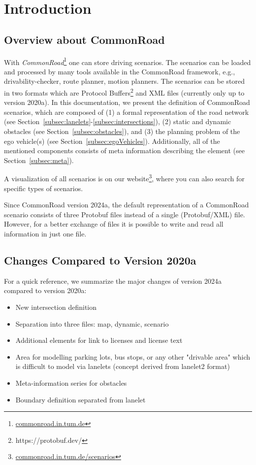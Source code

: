 
\section{Introduction}
\label{sec:introduction}
\subsection{Overview about CommonRoad}
With \textit{CommonRoad}\cite{Althoff2017a}\footnote{\href{https://commonroad.in.tum.de}{commonroad.in.tum.de}} one can store driving scenarios. The scenarios can be loaded and processed by many tools available in the CommonRoad framework, e.g., drivability-checker, route planner, motion planners.  
The scenarios can be stored in two formats which are Protocol Buffers\footnote{https://protobuf.dev/} and XML files (currently only up to version 2020a). 
In this documentation, we present the definition of CommonRoad scenarios, which are composed of (1) a formal representation of the road network (see Section~\ref{subsec:lanelets}-\ref{subsec:intersections}), (2) static and dynamic obstacles (see Section~\ref{subsec:obstacles}), and (3) the planning problem of the ego vehicle(s) (see Section~\ref{subsec:egoVehicles}). 
Additionally, all of the mentioned components consists of meta information describing the element (see Section~\ref{subsec:meta}).

A visualization of all scenarios is on our website\footnote{\href{https://commonroad.in.tum.de/scenarios/}{commonroad.in.tum.de/scenarios}}, where you can also search for specific types of scenarios.

Since CommonRoad version 2024a, the default representation of a CommonRoad scenario consists of three Protobuf files instead of a  single (Protobuf/XML) file.
However, for a better exchange of files it is possible to write and read all information in just one file.


\subsection{Changes Compared to Version 2020a}

For a quick reference, we summarize the major changes of version 2024a compared to version 2020a:
\begin{itemize}
\item New intersection definition
\item Separation into three files: map, dynamic, scenario 
\item Additional elements for link to licenses and license text
\item Area for modelling parking lots, bus stops, or any other "drivable area" which is difficult to model via lanelets (concept derived from lanelet2 format)
\item Meta-information series for obstacles
\item Boundary definition separated from lanelet 
\end{itemize}

